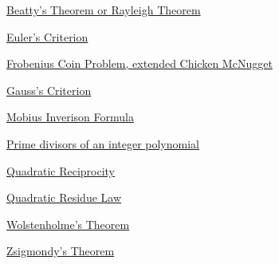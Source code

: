 \hyperref  [theorem:]{}

\hyperref  [theorem:]{}

\hyperref  [theorem:]{}

\hyperref  [theorem:]{}

\hyperref  [theorem:Beatty's Theorem or Rayleigh Theorem]{Beatty's Theorem or Rayleigh Theorem}

\hyperref  [theorem:Euler's Criterion]{Euler's Criterion}

\hyperref  [theorem:Frobenius Coin Problem, extended Chicken McNugget]{Frobenius Coin Problem, extended Chicken McNugget}

\hyperref  [theorem:Gauss's Criterion]{Gauss's Criterion}

\hyperref  [theorem:Mobius Inverison Formula]{Mobius Inverison Formula}

\hyperref  [theorem:Prime divisors of an integer polynomial]{Prime divisors of an integer polynomial}

\hyperref  [theorem:Quadratic Reciprocity]{Quadratic Reciprocity}

\hyperref  [theorem:Quadratic Residue Law]{Quadratic Residue Law}

\hyperref  [theorem:Wolstenholme's Theorem]{Wolstenholme's Theorem}

\hyperref  [theorem:Zsigmondy's Theorem]{Zsigmondy's Theorem}

